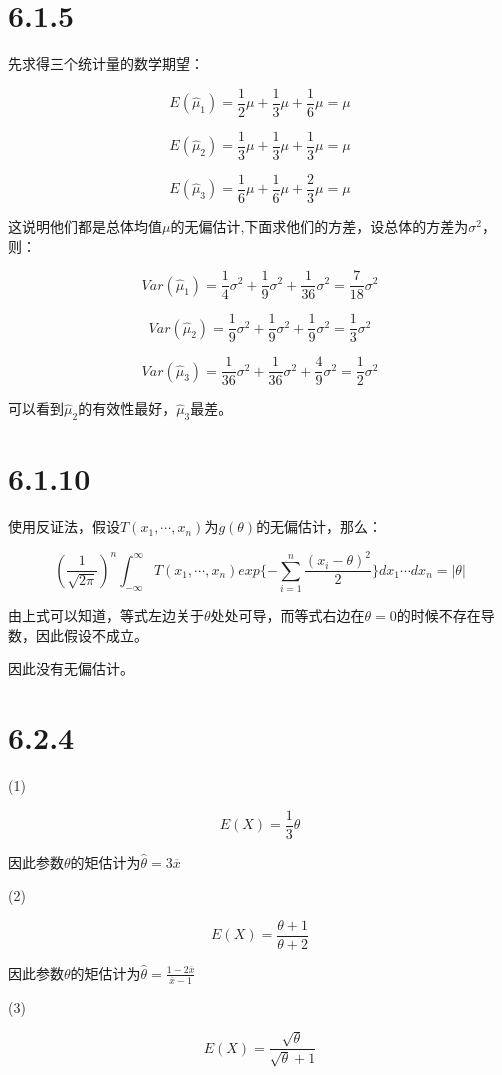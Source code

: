\documentclass{article}
\begin{document}
\section{6.1.5}
先求得三个统计量的数学期望：

$$E(\hat \mu_1)=\frac12\mu+\frac13\mu+\frac16\mu=\mu$$

$$E(\hat \mu_2)=\frac13\mu+\frac13\mu+\frac13\mu=\mu$$

$$E(\hat \mu_3)=\frac16\mu+\frac16\mu+\frac23\mu=\mu$$

这说明他们都是总体均值$\mu$的无偏估计,下面求他们的方差，设总体的方差为$\sigma^2$，则：

$$Var(\hat \mu_1)=\frac14\sigma^2+\frac19\sigma^2+\frac1{36}\sigma^2=\frac7{18}\sigma^2$$

$$Var(\hat \mu_2)=\frac19\sigma^2+\frac19\sigma^2+\frac1{9}\sigma^2=\frac13\sigma^2$$

$$Var(\hat \mu_3)=\frac1{36}\sigma^2+\frac1{36}\sigma^2+\frac49\sigma^2=\frac12\sigma^2$$

可以看到$\hat \mu_2$的有效性最好，$\hat \mu_3$最差。

\section{6.1.10}

使用反证法，假设$T(x_1,\cdots,x_n)$为$g(\theta)$的无偏估计，那么：

$$(\frac{1}{\sqrt{2\pi}})^n\int^{\infty}_{-\infty} T(x_1,\cdots,x_n)exp\{-\sum^{n}_{i=1}\frac{(x_i-\theta)^2}{2}\}dx_1\cdots dx_n=|\theta|$$

由上式可以知道，等式左边关于$\theta$处处可导，而等式右边在$\theta=0$的时候不存在导数，因此假设不成立。

因此没有无偏估计。

\section{6.2.4}
(1)

$$E(X)=\frac13\theta$$

因此参数$\theta$的矩估计为$\hat \theta=3\overline x$

(2)

$$E(X)=\frac{\theta+1}{\theta+2}$$

因此参数$\theta$的矩估计为$\hat \theta=\frac{1-2\overline x}{\overline x-1}$

(3)

$$E(X)=\frac{\sqrt \theta}{\sqrt \theta+1}$$
\end{document}
